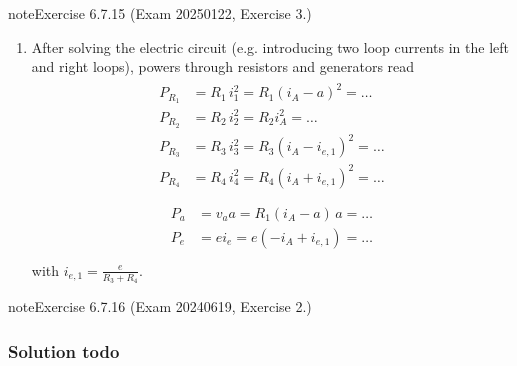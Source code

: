 \documentclass[letterpaper,10pt,english]{jupyterBook}
\begin{document}
\begin{sphinxadmonition}{note}{Exercise 6.7.15 (Exam 2025\sphinxhyphen{}01\sphinxhyphen{}22, Exercise 3.)}
\begin{enumerate}
\item {} 
\sphinxAtStartPar
After solving the electric circuit (e.g. introducing two loop currents in the left and right loops), powers through resistors and generators read
\begin{equation*}
\begin{split}\begin{aligned}
      P_{R_1} & = R_1 \, i_1^2 = R_1 (i_A - a)^2 = \dots \\
      P_{R_2} & = R_2 \, i_2^2 = R_2 i_A^2 = \dots \\
      P_{R_3} & = R_3 \, i_3^2 = R_3 (i_A - i_{e,1})^2 = \dots \\
      P_{R_4} & = R_4 \, i_4^2 = R_4 (i_A + i_{e,1})^2 = \dots \\
   \end{aligned}\end{split}
\end{equation*}\begin{equation*}
\begin{split}\begin{aligned}
      P_a & = v_a a = R_1 (i_A-a) \, a = \dots \\
      P_e & = e i_e = e ( -i_A + i_{e,1} ) = \dots \\
   \end{aligned}\end{split}
\end{equation*}
\sphinxAtStartPar
with \(i_{e,1} = \frac{e}{R_3 + R_4}\).

\end{enumerate}
\end{sphinxadmonition}
 \label{exercise:exam-24-06-19-exe-02}

\begin{sphinxadmonition}{note}{Exercise 6.7.16 (Exam 2024\sphinxhyphen{}06\sphinxhyphen{}19, Exercise 2.)}



\begin{figure}[htbp]
\centering

\noindent{}
\end{figure}
\subsubsection*{Solution \sphinxhyphen{} todo}
\end{sphinxadmonition}
 \label{exercise:exam-24-02-13-exe-01-a}
\end{document}
